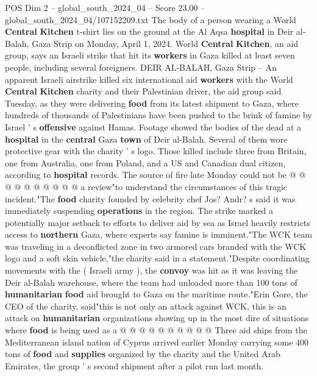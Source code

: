 \begin{textsample}{POS Dim 2 – global\_south\_2024\_04 – Score 23.00 – global\_south\_2024\_04/107152209.txt}  \label{ex:f2_pos_156}
The body of a person wearing a World \textbf{Central} \textbf{Kitchen} t-shirt lies on the ground at the Al Aqsa \textbf{hospital} in Deir al-Balah, Gaza Strip on Monday, April 1, 2024.
World \textbf{Central} \textbf{Kitchen}, an aid group, says an Israeli strike that hit its \textbf{workers} in Gaza killed at least seven people, including several foreigners.
DEIR AL-BALAH, Gaza Strip -- An apparent Israeli airstrike killed six international aid \textbf{workers} with the World \textbf{Central} \textbf{Kitchen} charity and their Palestinian driver, the aid group said Tuesday, as they were delivering \textbf{food} from its latest shipment to Gaza, where hundreds of thousands of Palestinians have been pushed to the brink of famine by Israel ' s \textbf{offensive} against Hamas.
Footage showed the bodies of the dead at a \textbf{hospital} in the \textbf{central} Gaza \textbf{town} of Deir al-Balah.
Several of them wore protective gear with the charity ' s logo.
Those killed include three from Britain, one from Australia, one from Poland, and a US and Canadian dual citizen, according to \textbf{hospital} records.
The source of fire late Monday could not be @ @ @ @ @ @ @ @ @ @ a review"to understand the circumstances of this tragic incident."The \textbf{food} charity founded by celebrity chef Jos?
Andr? s said it was immediately suspending \textbf{operations} in the region.
The strike marked a potentially major setback to efforts to deliver aid by sea as Israel heavily restricts access to \textbf{northern} Gaza, where experts say famine is imminent."The WCK team was traveling in a deconflicted zone in two armored cars branded with the WCK logo and a soft skin vehicle,"the charity said in a statement."Despite coordinating movements with the ( Israeli army ), the \textbf{convoy} was hit as it was leaving the Deir al-Balah warehouse, where the team had unloaded more than 100 tons of \textbf{humanitarian} \textbf{food} aid brought to Gaza on the maritime route."Erin Gore, the CEO of the charity, said"this is not only an attack against WCK, this is an attack on \textbf{humanitarian} organizations showing up in the most dire of situations where \textbf{food} is being used as a @ @ @ @ @ @ @ @ @ @ Three aid ships from the Mediterranean island nation of Cyprus arrived earlier Monday carrying some 400 tons of \textbf{food} and \textbf{supplies} organized by the charity and the United Arab Emirates, the group ' s second shipment after a pilot run last month.

\end{textsample}
